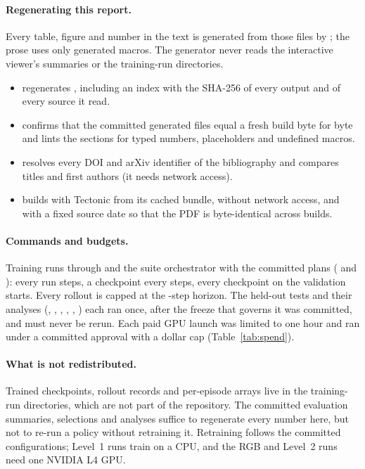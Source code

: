 \paragraph{Regenerating this report.} Every table, figure and number in the text is generated
from those files by ; the prose uses only generated macros. The
generator never reads the interactive viewer's summaries or the training-run directories.
\begin{itemize}
\item {} regenerates , including an index with
  the SHA-256 of every output and of every source it read.
\item {} confirms that the committed generated files equal a fresh build
  byte for byte and lints the sections for typed numbers, placeholders and undefined macros.
\item {} resolves every DOI and arXiv identifier of the bibliography
  and compares titles and first authors (it needs network access).
\item {} builds  with Tectonic from its cached bundle,
  without network access, and with a fixed source date so that the PDF is byte-identical
  across builds.
\end{itemize}

\paragraph{Commands and budgets.} Training runs through  and the suite
orchestrator  with the committed plans
( and ): every
run  steps, a checkpoint every  steps, every checkpoint on the
 validation starts. Every rollout is capped at the -step
horizon. The held-out tests and their analyses (,
, , ,
, ) each ran once, after the freeze that governs it was
committed, and must never be rerun. Each paid GPU launch was limited to one
hour and ran under a committed approval with a dollar cap (Table~\ref{tab:spend}).

\paragraph{What is not redistributed.} Trained checkpoints, rollout records and per-episode
arrays live in the training-run directories, which are not part of the repository. The
committed evaluation summaries, selections and analyses suffice to regenerate every number
here, but not to re-run a policy without retraining it. Retraining follows the committed
configurations; Level~1 runs train on a CPU, and the RGB and Level~2 runs need one NVIDIA L4
GPU.

\begin{table}[p]
\centering\scriptsize
\caption{Frozen sources read by the report generator, with their SHA-256 prefixes.}
\label{tab:sources}

\end{table}

